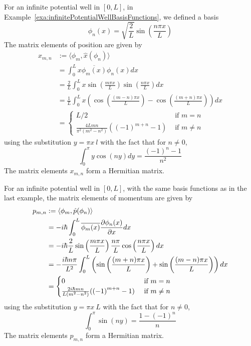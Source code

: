 \begin{example}
	For an infinite potential well in $[0, L]$, in Example~\ref{exa:infinitePotentialWellBasisFunctions}, we defined a basis
	\[
		\phi_n(x) = \sqrt{\frac{2}{L}} \sin \left( \frac{n \pi x}{L} \right)
	\]
	The matrix elements of position are given by
	\[
		\begin{aligned}
			x_{m, n}
				& := \langle \phi_m, \hat{x}(\phi_n) \rangle \\
				& = \int_{0}^{L} x \overline{\phi_m(x)} \phi_n(x) dx \\
				& = \frac{2}{L} \int_{0}^{L} x \sin \left( \frac{m \pi x}{L} \right) \sin \left( \frac{n \pi x}{L} \right) dx \\
				& = \frac{1}{L} \int_{0}^{L} x \left( \cos \left( \frac{(m - n) \pi x}{L} \right) - \cos \left( \frac{(m + n) \pi x}{L} \right) \right) dx \\
				& = \begin{cases}
					L / 2 & \text{ if } m = n \\
					\frac{4Lmn}{\pi^2 (m^2 - n^2)} ({(-1)}^{m + n} - 1) & \text{ if } m \ne n
				\end{cases}
		\end{aligned}
	\]
	using the substitution $y = \pi x \ l$ with the fact that for $n \ne 0$,
	\[
		\int_{0}^{\pi} y \cos(ny) dy = \frac{{(-1)}^n - 1}{n^2}
	\]
	The matrix elements $x_{m, n}$ form a Hermitian matrix.
\end{example}

\begin{example}
	For an infinite potential well in $[0, L]$, with the same basis functions as in the last example, the matrix elements of momentum are given by
	\[
		\begin{aligned}
			p_{m, n}
				& := \langle \phi_m, \hat{p}(\phi_n) \rangle \\
				& = -i \hbar \int_{0}^{L} \overline{\phi_m(x)} \diffp{\phi_n(x)}{x} dx \\
				& = -i \hbar \frac{2}{L} \sin \left( \frac{m \pi x}{L} \right) \frac{n \pi}{L} \cos \left( \frac{n \pi x}{L} \right) dx \\
				& = -\frac{i \hbar n \pi}{L^2} \int_{0}^{L} \left( \sin \left( \frac{(m + n) \pi x}{L} \right) + \sin \left( \frac{(m - n) \pi x}{L} \right) \right) dx \\
				& = \begin{cases}
					0 & \text{ if } m = n \\
					\frac{2i \hbar mn}{L (m^2 - n^2)} ({(-1)}^{m + n} - 1) & \text{ if } m \ne n
				\end{cases}
		\end{aligned}
	\]
	using the substitution $y = \pi x \ L$ with the fact that for $n \ne 0$,
	\[
		\int_{0}^{\pi} \sin(ny) = \frac{1 - {(-1)}^n}{n}
	\]
	The matrix elements $p_{m, n}$ form a Hermitian matrix.
\end{example}

